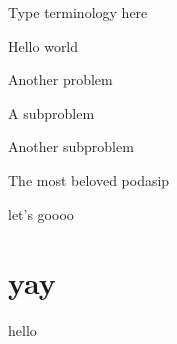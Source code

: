 \documentclass[11pt]{rosspset}
\begin{document}
\maketitle

\begin{terminology}
    \item Type terminology here
\end{terminology}

\numerical

\begin{problem}
    Hello world
\end{problem}

\exploration

\begin{problem}
    Another problem
    \begin{subproblem}
        \item A subproblem
        \item Another subproblem
    \end{subproblem}
\end{problem}

\podasip

\begin{problem}
    The most beloved podasip
\end{problem}


\begin{problem}
    let's goooo
\end{problem}

\section{yay}

\begin{problem}
    hello
\end{problem}
\end{document}
